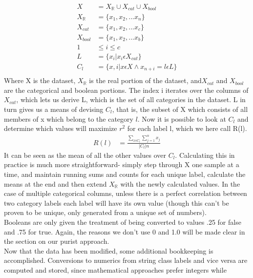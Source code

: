 \begin{align*}
X &= {X_\mathbb{R} \cup X_{cat} \cup X_{bool}}\\
X_\mathbb{R} &= \{x_1, x_2, ... x_n\}\\
X_{cat} &= \{x_1, x_2, ... x_c\}\\%
X_{bool} &= \{x_1, x_2, ... x_b\} \\
1&\leq i \leq c\\
L &= \{x_i|x_i\epsilon X_{cat}\}\\%
C_l &= \{x, i|  x\epsilon X \wedge x_{n+i} = l\epsilon L \}\\%
\end{align*}
Where X is the dataset, $X_\mathbb{R}$ is the real portion of the dataset, and$
X_{cat}$ and $X_{bool}$ are the categorical and boolean portions.  The index i
iterates over the columns of $X_{cat}$, which lets us derive L, which is the set
of all categories in the dataset.  L in turn gives us a means of devising $C_l$,
that is, the subset of X which consists of all members of x which belong to the
category $l$. Now it is possible to look at $C_l$ and determine which values
will maximize $r^2$ for each label l, which we here call R(l).
\begin{align}
R(l) &= \frac{\sum_{x\epsilon C_l}\sum_{j=1}^{n}x_j}{|C_l|n}
\end{align} 
It can be seen as the mean of all the other values over $C_l$.  Calculating this
in practice is much more straightforward- simply step through X one sample at a
time, and maintain running sums and counts for each unique label, calculate the
means at the end and then extend $X_\mathbb{R}$ with the newly calculated
values.  In the case of multiple categorical columns, unless there is a perfect
correlation between two category labels each label will have its own value
(though this can't be proven to be unique, only generated from a unique set of
numbers).\\
Booleans are only given the treatment of being converted to values .25 for false
and .75 for true.  Again, the reasons we don't use 0 and 1.0 will be made clear
in the section on our purist approach.\\
Now that the data has been modified, some additional bookkeeping is
accomplished.  Conversions to numerics from string class labels and vice versa
are computed and stored, since mathematical approaches prefer integers while
